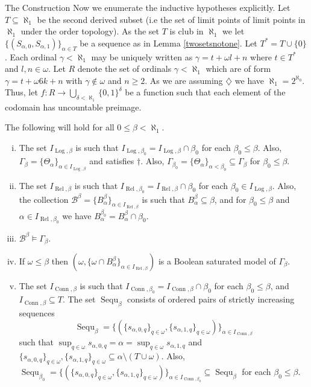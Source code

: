 \documentclass{amsart}
\theoremstyle{definition}\newtheorem{theorem}{Theorem}
\theoremstyle{definition}\newtheorem{bigtheorem}{Theorem}
\numberwithin{theorem}{section}
\theoremstyle{definition}\newtheorem{corollary}[theorem]{Corollary}
\theoremstyle{definition}\newtheorem{proposition}[theorem]{Proposition}
\theoremstyle{definition}\newtheorem{definition}[theorem]{Definition}
\theoremstyle{definition}\newtheorem{question}[theorem]{Question}
\theoremstyle{definition}\newtheorem{example}[theorem]{Example}
\theoremstyle{definition}\newtheorem{remark}[theorem]{Remark}
\theoremstyle{definition}\newtheorem{note}[theorem]{Note}
\theoremstyle{definition}\newtheorem{lemma}[theorem]{Lemma}
\theoremstyle{definition}\newtheorem{fact}[theorem]{Fact}
\theoremstyle{definition}\newtheorem{define}[theorem]{Definition}
\theoremstyle{definition}\newtheorem{definitions}[theorem]{Definitions}
\theoremstyle{definition}\newtheorem{claim}[theorem]{Claim}
\theoremstyle{definition}\newtheorem{obs}[theorem]{Observation}
\theoremstyle{definition}\newtheorem{construction}[theorem]{Construction}
\newcommand{\Rel}{\operatorname{Rel}}
\newcommand{\Log}{\operatorname{Log}}
\newcommand{\Conn}{\operatorname{Conn}}
\newcommand{\Bo}{\mathcal{B}}
\newcommand{\Sequ}{\operatorname{Sequ}}
\begin{document}
\begin{section}{The Construction}
Now we enumerate the inductive hypotheses explicitly.  Let $T \subseteq \aleph_1$ be the second derived subset (i.e the set of limit points of limit points in $\aleph_1$ under the order topology).  As the set $T$ is club in $\aleph_1$ we let $\{(S_{\alpha, 0}, S_{\alpha, 1})\}_{\alpha \in T}$ be a sequence as in Lemma \ref{twosetsnotone}.  Let $T^* = T \cup \{0\}$.  Each ordinal $\gamma < \aleph_1$ may be uniquely written as $\gamma = t + \omega l + n$ where $t \in T^*$ and $l, n\in \omega$.  Let $R$ denote the set of ordinals $\gamma <\aleph_1$ which are of form $\gamma = t + \omega 6k +n$ with $\gamma \notin \omega$ and $n \geq 2$.  As we are assuming $\diamondsuit$ we have $\aleph_1 = 2^{\aleph_0}$.  Thus, let $f: R \rightarrow \bigcup_{\delta < \aleph_1} \{0, 1\}^{\delta}$ be a function such that each element of the codomain has uncountable preimage.


The following will hold for all $0 \leq \beta < \aleph_1$.


\begin{enumerate}[(i)]

\item The set $I_{\Log, \beta}$ is such that $I_{\Log, \beta_0} = I_{\Log, \beta} \cap \beta_0$ for each $\beta_0 \leq \beta$.  Also, $\Gamma_{\beta} = \{\Theta_{\alpha}\}_{\alpha \in I_{\Log, \beta}}$ and satisfies $\dagger$.  Also, $\Gamma_{\beta_0} = \{\Theta_{\alpha}\}_{\alpha <\beta_0} \subseteq \Gamma_{\beta}$ for $\beta_0 \leq \beta$.

\item The set $I_{\Rel, \beta}$ is such that $I_{\Rel, \beta_0} = I_{\Rel, \beta} \cap \beta_0$ for each $\beta_0 \in I_{\Log, \beta}$.  Also, the collection $\Bo^{\beta} = \{B_{\alpha}^{\beta}\}_{\alpha \in I_{\Rel, \beta}}$ is such that $B_{\alpha}^{\beta} \subseteq \beta$, and for $\beta_0 \leq \beta$ and $\alpha \in I_{\Rel, \beta_0}$ we have $B_{\alpha}^{\beta_0} = B_{\alpha}^{\beta} \cap \beta_0$.

\item $\Bo^{\beta}\models \Gamma_{\beta}$.

\item If $\omega \leq \beta$ then $(\omega, \{\omega \cap B_{\alpha}^{\beta}\}_{\alpha \in I_{\Rel, \beta}})$ is a Boolean saturated model of $\Gamma_{\beta}$.

\item The set $I_{\Conn, \beta}$ is such that $I_{\Conn, \beta_0} = I_{\Conn, \beta} \cap \beta_0$ for each $\beta_0 \leq \beta$, and $I_{\Conn, \beta} \subseteq T$.  The set $\Sequ_{\beta}$ consists of ordered pairs of strictly increasing sequences $$\Sequ_{\beta} = \{(\{s_{\alpha, 0, q}\}_{q \in \omega}, \{s_{\alpha, 1, q}\}_{q \in \omega})\}_{\alpha \in I_{\Conn, \beta}}$$ such that $\sup_{q \in \omega} s_{\alpha, 0, q} = \alpha = \sup_{q \in \omega} s_{\alpha, 1, q}$ and $\{s_{\alpha, 0, q}\}_{q\in \omega}, \{s_{\alpha, 1, q}\}_{q \in \omega} \subseteq \alpha \setminus (T \cup \omega)$.  Also, $\Sequ_{\beta_0} = \{(\{s_{\alpha, 0, q}\}_{q\in \omega}, \{s_{\alpha, 1, q}\}_{q \in \omega})\}_{\alpha \in I_{\Conn, \beta_0}} \subseteq \Sequ_{\beta}$ for each $\beta_0 \leq \beta$.


\end{enumerate}
\end{section}
\end{document}
